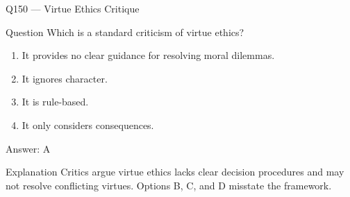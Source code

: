 \documentclass[aspectratio=169,8pt]{beamer}
\begin{document}
\begin{frame}{Q150 --- Virtue Ethics Critique}
\begin{block}{Question}
Which is a standard criticism of virtue ethics?
\begin{enumerate}
\item It provides no clear guidance for resolving moral dilemmas.
\item It ignores character.
\item It is rule-based.
\item It only considers consequences.
\end{enumerate} 	\end{block}
\begin{exampleblock}{Answer: A}\end{exampleblock}
\begin{block}{Explanation}
Critics argue virtue ethics lacks clear decision procedures and may not resolve conflicting virtues. Options B, C, and D misstate the framework.
\end{block}
\end{frame}
\end{document}

